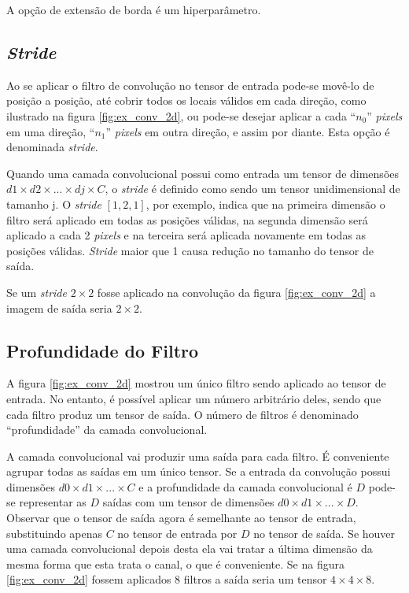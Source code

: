A opção de extensão de borda é um hiperparâmetro.

\subsection{\emph{Stride}}
Ao se aplicar o filtro de convolução no tensor de entrada pode-se movê-lo de
posição a posição, até cobrir todos os locais válidos em cada direção, como
ilustrado na figura \ref{fig:ex_conv_2d}, ou pode-se desejar aplicar a cada
``$n_0$'' \emph{pixels} em uma direção, ``$n_1$'' \emph{pixels} em outra
direção, e assim por diante.  Esta opção é denominada \emph{stride}.

Quando uma camada convolucional possui como entrada um tensor de dimensões
$d1\times d2 \times ... \times dj \times C$, o \emph{stride} é definido como
sendo um tensor unidimensional de tamanho j.
O \emph{stride} $[1,2,1]$, por exemplo, indica que na primeira dimensão o
filtro será aplicado em todas as posições válidas, na segunda dimensão será
aplicado a cada 2 \emph{pixels} e na terceira será aplicada novamente em
todas as posições válidas. \emph{Stride} maior que 1 causa redução no
tamanho do tensor de saída.

Se um \emph{stride} $2 \times 2$ fosse aplicado na convolução da figura
\ref{fig:ex_conv_2d} a imagem de saída seria $2 \times 2$.

\subsection{Profundidade do Filtro}
A figura \ref{fig:ex_conv_2d} mostrou um único filtro sendo aplicado ao
tensor de entrada. No entanto, é possível aplicar um número arbitrário
deles, sendo que cada filtro produz um tensor de saída. O número de filtros é
denominado ``profundidade'' da camada convolucional.

A camada convolucional vai produzir uma saída para cada filtro. É conveniente
agrupar todas as saídas em um único tensor. Se a entrada da convolução
possui dimensões $d0 \times d1 \times ... \times C$ e a profundidade da camada
convolucional é $D$ pode-se representar as $D$ saídas com um tensor de
dimensões $d0 \times d1 \times ... \times D$. Observar que o tensor de saída
agora é semelhante ao tensor de entrada, substituindo apenas $C$ no tensor de
entrada por $D$ no tensor de saída. Se houver uma camada convolucional depois
desta ela vai tratar a última dimensão da mesma forma que esta trata o canal, o
que é conveniente. Se na figura \ref{fig:ex_conv_2d} fossem aplicados 8
filtros a saída seria um tensor $4 \times 4 \times 8$.

